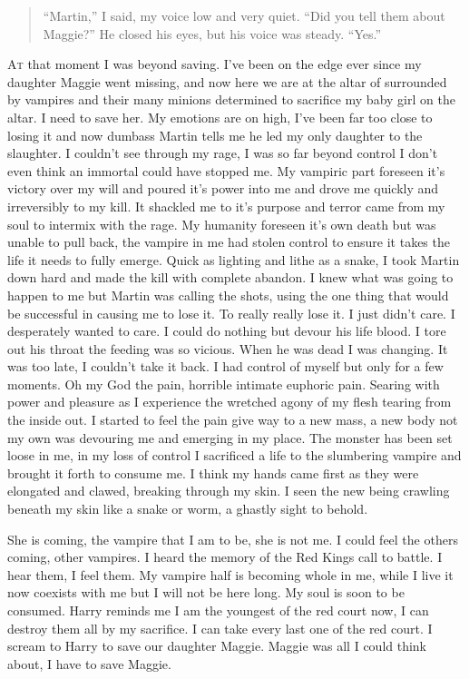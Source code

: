 
\begin{quote}
	``Martin,” I said, my voice low and very quiet. “Did you tell them about Maggie?”
	He closed his eyes, but his voice was steady. “Yes.”
\end{quote}

\lettrine[lines=2,lraise=0]{A}t that moment I was beyond saving. I've been on the edge ever since my daughter Maggie went missing, and now here we are at the altar of \chichenitza surrounded by vampires and their many minions determined to sacrifice my baby girl on the altar. I need to save her. 
My emotions are on high, I've been far too close to losing it and now dumbass Martin tells me he led my only daughter to the slaughter. I couldn't see through my rage, I was so far beyond control I don't even think an immortal could have stopped me. My vampiric part foreseen it's victory over my will and poured it's power into me and drove me quickly and irreversibly to my kill. It shackled me to it's purpose and terror came from my soul to intermix with the rage. My humanity foreseen it's own death but was unable to pull back, the vampire in me had stolen control to ensure it takes the life it needs to fully emerge. Quick as lighting and lithe as a snake, I took Martin down hard and made the kill with complete abandon. 
I knew what was going to happen to me but Martin was calling the shots, using the one thing that would be successful in causing me to lose it. To really really lose it. I just didn't care. I desperately wanted to care. I could do nothing but devour his life blood. I tore out his throat the feeding was so vicious. When he was dead I was changing. It was too late, I couldn't take it back. I had control of myself but only for a few moments. Oh my God the pain, horrible intimate euphoric pain. Searing with power and pleasure as I experience the wretched agony of my flesh tearing from the inside out. I started to feel the pain give way to a new mass, a new body not my own was devouring me and emerging in my place. The monster has been set loose in me, in my loss of control I sacrificed a life to the slumbering vampire and brought it forth to consume me. I think my hands came first as they were elongated and clawed, breaking through my skin. I seen the new being crawling beneath my skin like a snake or worm, a ghastly sight to behold.

She is coming, the vampire that I am to be, she is not me. I could feel the others coming, other vampires. I heard the memory of the Red Kings call to battle. I hear them, I feel them. My vampire half is becoming whole in me, while I live it now coexists with me but I will not be here long. My soul is soon to be consumed. Harry reminds me I am the youngest of the red court now, I can destroy them all by my sacrifice. I can take every last one of the red court. I scream to Harry to save our daughter Maggie. Maggie was all I could think about, I have to save Maggie.

